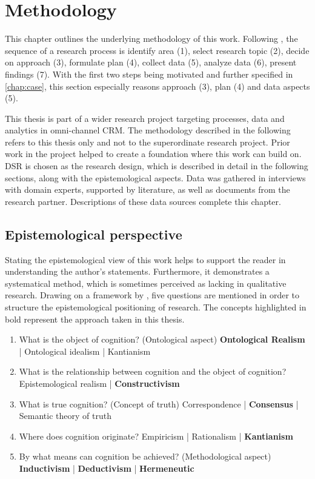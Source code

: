 \chapter{Methodology}
This chapter outlines the underlying methodology of this work. Following \cite{gilljohnson}, the sequence of a research process is identify area (1), select research topic (2), decide on approach (3), formulate plan (4), collect data (5),  analyze data (6), present findings (7). With the first two steps being motivated and further specified in \ref{chap:case}, this section especially reasons approach (3), plan (4) and data aspects (5). 

This thesis is part of a wider research project targeting processes, data and analytics in omni-channel CRM. The methodology described in the following refers to this thesis only and not to the superordinate research project. Prior work in the project helped to create a foundation where this work can build on. \acrfull{DSR} is chosen as the research design, which is described in detail in the following sections, along with the epistemological aspects. Data was gathered in interviews with domain experts, supported by literature, as well as documents from the research partner. Descriptions of these data sources complete this chapter. 


	\section{Epistemological perspective}
Stating the epistemological view of this work helps to support the reader in understanding the author's statements. Furthermore, it demonstrates a systematical method, which is sometimes perceived as lacking in qualitative research. Drawing on a framework by \cite{becker2007epistemological}, five questions are mentioned in order to structure the epistemological positioning of research. The concepts highlighted in bold represent the approach taken in this thesis. 

\begin{enumerate}
	\item What is the object of cognition? (Ontological aspect)
		\subitem \textbf{Ontological Realism} | Ontological idealism  | Kantianism
	\item What is the relationship between cognition and the object of cognition?
		\subitem Epistemological realism | \textbf{Constructivism}
	\item What is true cognition? (Concept of truth)
		\subitem Correspondence |  \textbf{Consensus} |  Semantic theory of truth
	\item Where does cognition originate?
	\subitem Empiricism | Rationalism | \textbf{Kantianism}
	\item By what means can cognition be achieved? (Methodological aspect)
		\subitem \textbf{Inductivism} | \textbf{Deductivism} | \textbf{Hermeneutic}
\end{enumerate}

